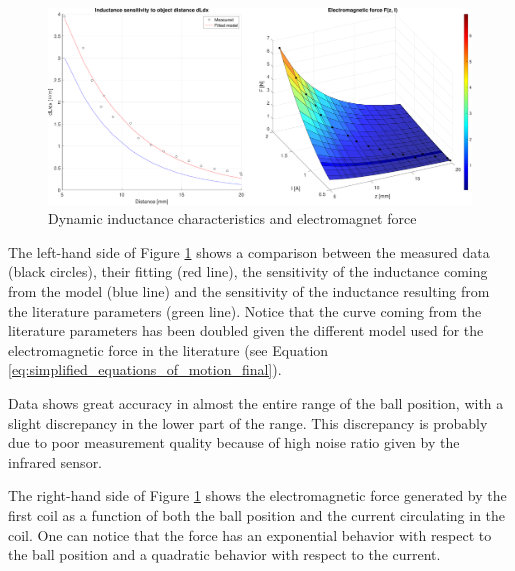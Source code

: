 \begin{figure}[H]
    \centering
    \includegraphics[width=1\textwidth]{img/MATLAB/identification/force.pdf}
    \caption{Dynamic inductance characteristics and electromagnet force}
    \label{fig:dynamic_inductance_characteristics}
\end{figure}

The left-hand side of Figure \ref{fig:dynamic_inductance_characteristics} shows a comparison between the measured data (black circles), their fitting (red line), the sensitivity of the inductance coming from the model (blue line) and the sensitivity of the inductance resulting from the literature parameters (green line).
Notice that the curve coming from the literature parameters has been doubled given the different model used for the electromagnetic force in the literature (see Equation \ref{eq:simplified_equations_of_motion_final}).

Data shows great accuracy in almost the entire range of the ball position, with a slight discrepancy in the lower part of the range.
This discrepancy is probably due to poor measurement quality because of high noise ratio given by the infrared sensor.

The right-hand side of Figure \ref{fig:dynamic_inductance_characteristics} shows the electromagnetic force generated by the first coil as a function of both the ball position and the current circulating in the coil.
One can notice that the force has an exponential behavior with respect to the ball position and a quadratic behavior with respect to the current.